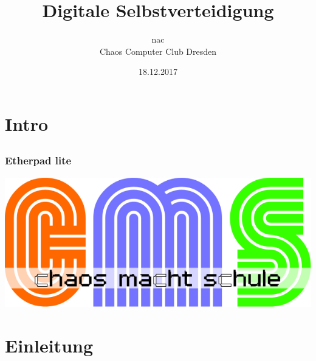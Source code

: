 \documentclass[12pt, table]{beamer}
\title{Digitale Selbstverteidigung}
\author{\small nac\\\large Chaos Computer Club Dresden}
\date{18.12.2017}
\begin{document}
\section{Intro}
	\subsection{}

\begin{frame}
	\frametitle{Etherpad lite}
	\begin{center}
    \end{center}
\end{frame}

\begin{frame}
	\begin{center}
    	\includegraphics[height=0.5\textheight]{../img/cms-text.png}
    \end{center}
\end{frame}

\section{Einleitung}
	\subsection{}
\end{document}
